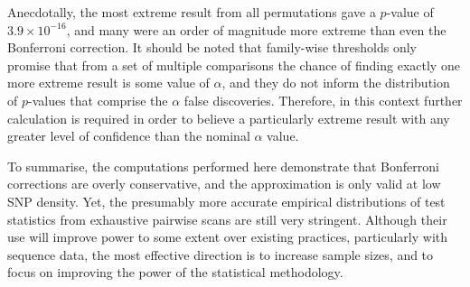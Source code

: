 Anecdotally, the most extreme result from all permutations gave a $p$-value of $3.9 \times 10^{-16}$, and many were an order of magnitude more extreme than even the Bonferroni correction. It should be noted that family-wise thresholds only promise that from a set of multiple comparisons the chance of finding exactly one more extreme result is some value of $\alpha$, and they do not inform the distribution of $p$-values that comprise the $\alpha$ false discoveries. Therefore, in this context further calculation is required in order to believe a particularly extreme result with any greater level of confidence than the nominal $\alpha$ value. 

To summarise, the computations performed here demonstrate that Bonferroni corrections are overly conservative, and the \citet{Becker2011} approximation is only valid at low SNP density. Yet, the presumably more accurate empirical distributions of test statistics from exhaustive pairwise scans are still very stringent. Although their use will improve power to some extent over existing practices, particularly with sequence data, the most effective direction is to increase sample sizes, and to focus on improving the power of the statistical methodology.
